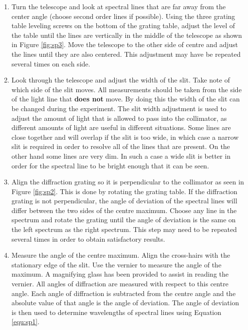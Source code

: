 \begin{enumerate}
\item Turn the telescope and look at spectral lines that are far away from the center angle (choose second order lines if possible). Using the three grating table leveling screws on the bottom of the grating table, adjust the level of the table until the lines are vertically in the middle of the telescope as shown in Figure \ref{fig:sp3}. Move the  telescope to the other side of centre and adjust the lines until they are also centered. This adjustment may have be repeated several times on each side.

\item Look through the telescope and adjust the width of the slit. Take note of which side of the slit moves. All measurements should be taken from the side of the light line that {\bf does not} move. By doing this the width of the slit can be changed during the experiment. The slit width adjustment is used to adjust the amount of light that is allowed to pass into the collimator, as different amounts of light are useful in different situations. Some lines are close together and will overlap if the slit is too wide, in which case a narrow slit is required in order to resolve all of the lines that are present. On the other hand some lines are very dim. In such a case a wide slit is better in order for the spectral line to be bright enough that it can be seen.

\item Align the diffraction grating so it is perpendicular to the collimator as seen in Figure \ref{fig:sp2}. This is done by rotating the grating table. If the diffraction grating is not perpendicular, the angle of deviation of the spectral lines will differ between the two sides of the centre maximum. Choose any line in the spectrum and rotate the grating until the angle of deviation is the same on the left spectrum as the right spectrum. This step may need to be repeated several times in order to obtain satisfactory results.   

\item Measure the angle of the centre maximum. Align the cross-hairs with the stationary edge of the slit. Use the vernier to measure the angle of the maximum. A magnifying glass has been provided to assist in reading the vernier. All angles of diffraction are measured with respect to this centre angle. Each angle of diffraction is subtracted from the centre angle and the absolute value of that angle is the angle of deviation. The angle of deviation is then used to determine wavelengths of spectral lines using Equation \ref{equ:sp1}.
 

\end{enumerate}
